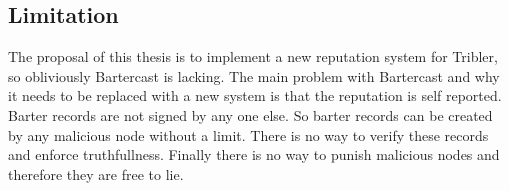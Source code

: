 \subsection{Limitation}
The proposal of this thesis is to implement a new reputation system for Tribler,
so obliviously Bartercast is lacking.
The main problem with Bartercast and why it needs to be replaced with a new system is
that the reputation is self reported.
Barter records are not signed by any one else.
So barter records can be created by any malicious node without a limit.
There is no way to verify these records and enforce truthfullness.
Finally there is no way to punish malicious nodes and therefore they are free to lie.



